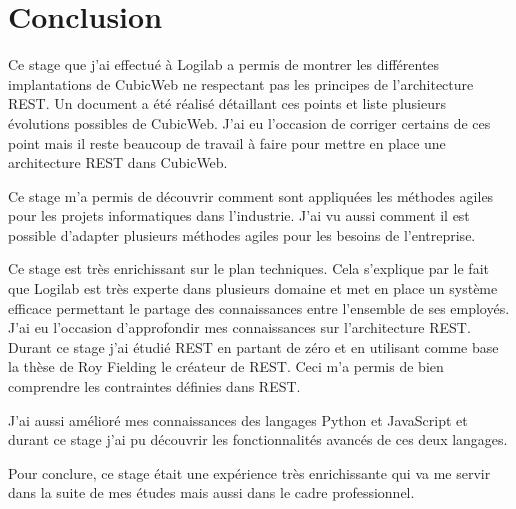 \chapter*{Conclusion}
Ce stage que j'ai effectué à Logilab a permis de montrer les différentes implantations de CubicWeb ne respectant pas les principes de l'architecture REST. Un document a été réalisé détaillant ces points et liste plusieurs évolutions possibles de CubicWeb. J'ai eu l'occasion de corriger certains de ces point mais il reste beaucoup de travail à faire pour mettre en place une architecture REST dans CubicWeb.     

Ce stage m'a permis de découvrir comment sont appliquées les méthodes agiles pour les projets informatiques
dans l'industrie. J'ai vu aussi comment il est possible d'adapter plusieurs méthodes agiles pour les besoins de l'entreprise.

Ce stage est très enrichissant sur le plan techniques. Cela s'explique par le fait que Logilab est très experte dans plusieurs domaine et met en place un système efficace permettant le partage des connaissances entre l'ensemble de ses employés. J'ai eu l'occasion d'approfondir mes connaissances sur l'architecture REST. Durant ce stage j'ai étudié REST en partant de zéro et en utilisant comme base la thèse de Roy Fielding le créateur de REST. Ceci m'a permis de bien comprendre les contraintes définies dans REST. 

J'ai aussi amélioré mes connaissances des langages Python et JavaScript et durant ce stage j'ai pu découvrir les fonctionnalités avancés de ces deux langages. 

Pour conclure, ce stage était une expérience très enrichissante qui va me servir dans la suite de mes études mais aussi dans le cadre professionnel.
